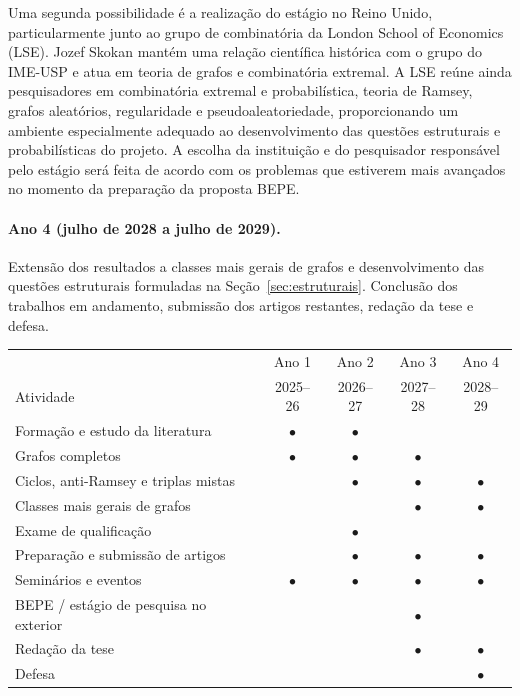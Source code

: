\documentclass[11pt,a4paper]{article}
\theoremstyle{plain}
\theoremstyle{definition}
\begin{document}
Uma segunda possibilidade é a realização do estágio no Reino Unido,
particularmente junto ao grupo de combinatória da London School of Economics
(LSE). Jozef Skokan mantém uma relação científica histórica com o grupo do
IME-USP e atua em teoria de grafos e combinatória extremal. A LSE reúne ainda
pesquisadores em combinatória extremal e probabilística, teoria de Ramsey,
grafos aleatórios, regularidade e pseudoaleatoriedade, proporcionando um
ambiente especialmente adequado ao desenvolvimento das questões estruturais
e probabilísticas do projeto. A escolha da instituição e do pesquisador
responsável pelo estágio será feita de acordo com os problemas que estiverem
mais avançados no momento da preparação da proposta BEPE.

\paragraph{Ano 4 (julho de 2028 a julho de 2029).}
Extensão dos resultados a classes mais gerais de grafos e desenvolvimento das
questões estruturais formuladas na Seção~\ref{sec:estruturais}. Conclusão dos
trabalhos em andamento, submissão dos artigos restantes, redação da tese e
defesa.

\begin{center}
  \begin{tabular}{lcccc}
    \toprule
                                      & Ano 1     & Ano 2     & Ano 3     & Ano 4     \\
    Atividade                         & 2025--26  & 2026--27  & 2027--28  & 2028--29  \\
    \midrule
    Formação e estudo da literatura   & $\bullet$ & $\bullet$ &           &           \\
    Grafos completos                  & $\bullet$ & $\bullet$ & $\bullet$ &           \\
    Ciclos, anti-Ramsey e triplas mistas
                                      &           & $\bullet$ & $\bullet$ & $\bullet$ \\
    Classes mais gerais de grafos     &           &           & $\bullet$ & $\bullet$ \\
    Exame de qualificação             &           & $\bullet$ &           &           \\
    Preparação e submissão de artigos &           & $\bullet$ & $\bullet$ & $\bullet$ \\
    Seminários e eventos              & $\bullet$ & $\bullet$ & $\bullet$ & $\bullet$ \\
    BEPE / estágio de pesquisa no exterior
                                      &           &           & $\bullet$ &           \\
    Redação da tese                   &           &           & $\bullet$ & $\bullet$ \\
    Defesa                            &           &           &           & $\bullet$ \\
    \bottomrule
  \end{tabular}
\end{center}
\end{document}
